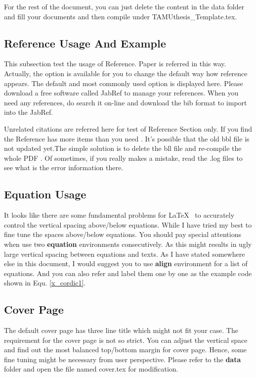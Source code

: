 For the rest of the document, you can just delete the content in the data folder and fill your documents and then compile under TAMUthesis\_Template.tex.

\subsection{Reference Usage And Example}

This subsection test the usage of Reference. Paper\cite{AhmadiF} is referred in this way. Actually, the option is available for you to change the default way how reference appears. The default and most commonly used option \cite{PetterVary2006.March} is displayed here. Please download a free software called JabRef to manage your references. When you need any references, do search it on-line and download the bib format to import into the JabRef. 

Unrelated citations are referred here for test of Reference Section only\cite{Andraka1998}. If you find the Reference\cite{Azzarello2005} has more items than you need \cite{Beritelli2002}. It's possible that the old bbl file\cite{Boyd1985} is not updated yet.The simple solution\cite{Carew1998} is to delete the bll file and re-compile the whole PDF \cite{Callanan1995}. Of sometimes, if you really makes a mistake, read the .log files to see what is the error information there.

\subsection{Equation Usage}
It looks like there are some fundamental problems for \LaTeX~ to accurately control the vertical spacing above/below equations. While I have tried my best to fine tune the spaces above/below equations. You should pay special attentions when use two \textbf{equation} environments consecutively. As this might results in ugly large vertical spacing between equations and texts. As I have stated somewhere else in this document, I would suggest you to use \textbf{align} environment for a list of equations. And you can also refer and label them one by one as the example code shown in Equ. \eqref{x_cordic1}.

\subsection{Cover Page}
The default cover page has three line title which might not fit your case. The requirement for the cover page is not so strict. You can adjust the vertical space and find out the most balanced top/bottom margin for cover page. Hence, some fine tuning might be necessary from user perspective. Please refer to the \textbf{data} folder and open the file named cover.tex for modification.

